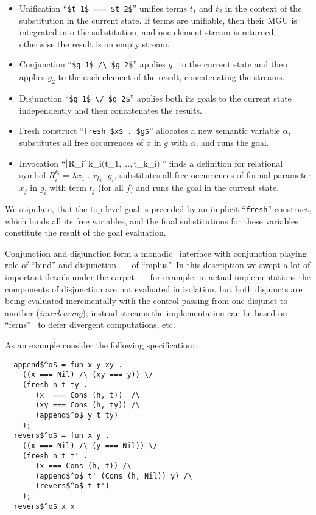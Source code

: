 \begin{itemize}
\item Unification ``\lstinline|$t_1$ === $t_2$|'' unifies terms $t_1$ and $t_2$ in the context of the substitution in the current state. If terms are unifiable,
  then their MGU is integrated into the substitution, and one-element stream is returned; otherwise the result is an empty stream.
\item Conjunction ``\lstinline|$g_1$ /\ $g_2$|'' applies $g_1$ to the current state and then applies $g_2$ to the each element of the result, concatenating
  the streams.
\item Disjunction ``\lstinline|$g_1$ \/ $g_2$|'' applies both its goals to the current state independently and then concatenates the results.
\item Fresh construct ``\lstinline|fresh $x$ . $g$|'' allocates a new semantic variable $\alpha$, substitutes all free occurrences of $x$ in $g$ with $\alpha$, and
  runs the goal.
\item Invocation ``$\lstinline|$R_i^{k_i}$ ($t_1$,...,$t_{k_i}$)|$'' finds a definition for relational symbol $R_i^{k_i}=\lambda x_1\dots x_{k_i}\,.\,g_i$, substitutes
  all free occurrences of formal parameter $x_j$ in $g_i$ with term $t_j$ (for all $j$) and runs the goal in the current state.
\end{itemize}

We stipulate, that the top-level goal is preceded by an implicit ``\lstinline|fresh|'' construct, which binds all its free variables, and the final substitutions for these
variables constitute the result of the goal evaluation.

Conjunction and disjunction form a monadic~\cite{Monads} interface with conjunction playing role of ``bind'' and disjunction~--- of ``mplus''. In this description
we swept a lot of important details under the carpet~--- for example, in actual implementations the components of disjunction are not evaluated in isolation, but
both disjuncts are being evaluated incrementally with the control passing from one disjunct to another (\emph{interleaving}); instead streams the implementation
can be based on ``ferns''~\cite{BottomAvoiding} to defer divergent computations, etc. 

As an example consider the following specification:

\begin{lstlisting}
  append$^o$ = fun x y xy .
    ((x === Nil) /\ (xy === y)) \/
    (fresh h t ty .
       (x  === Cons (h, t))  /\
       (xy === Cons (h, ty)) /\
       (append$^o$ y t ty)
    );
  revers$^o$ = fun x y .
    ((x === Nil) /\ (y === Nil)) \/
    (fresh h t t' .
       (x === Cons (h, t)) /\
       (append$^o$ t' (Cons (h, Nil)) y) /\
       (revers$^o$ t t') 
    );
  revers$^o$ x x
\end{lstlisting}

